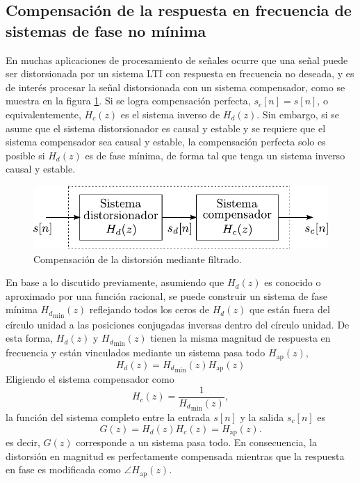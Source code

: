 \documentclass[a4paper]{report}
\begin{document}
\subsection{Compensación de la respuesta en frecuencia de sistemas de fase no mínima}\label{sec:transform_analysis_non_minimum_phase_compensation}

En muchas aplicaciones de procesamiento de señales ocurre que una señal puede ser distorsionada por un sistema LTI con respuesta en frecuencia no deseada, y es de interés procesar la señal distorsionada con un sistema compensador, como se muestra en la figura \ref{fig:non_minimum_phase_freq_response_compensation}. Si se logra compensación perfecta, \(s_c[n]=s[n]\), o equivalentemente, \(H_c(z)\) es el sistema inverso de \(H_d(z)\). Sin embargo, si se asume que el sistema distorsionador es causal y estable y se requiere que el sistema compensador sea causal y estable, la compensación perfecta solo es posible si \(H_d(z)\) es de fase mínima, de forma tal que tenga un sistema inverso causal y estable.
\begin{figure}[!htb]
 \begin{minipage}[c]{0.53\textwidth}
  \includegraphics[width=\textwidth]{figuras/non_minimum_phase_freq_response_compensation.pdf}
 \end{minipage}\hfill
 \begin{minipage}[c]{0.37\textwidth}
 \caption{Compensación de la distorsión mediante filtrado.
 }\label{fig:non_minimum_phase_freq_response_compensation}
 \end{minipage}
\end{figure}

En base a lo discutido previamente, asumiendo que \(H_d(z)\) es conocido o aproximado por una función racional, se puede construir un sistema de fase mínima \({H_d}_\textrm{min}(z)\) reflejando todos los ceros de \(H_d(z)\) que están fuera del círculo unidad a las posiciones conjugadas inversas dentro del círculo unidad. De esta forma, \(H_d(z)\) y \({H_d}_\textrm{min}(z)\) tienen la misma magnitud de respuesta en frecuencia y están vinculados mediante un sistema pasa todo \(H_\textrm{ap}(z)\),
\[
 H_d(z)={H_d}_\textrm{min}(z)H_\textrm{ap}(z)
\]
Eligiendo el sistema compensador como
\[
 H_c(z)=\frac{1}{{H_d}_\textrm{min}(z)},
\]
la función del sistema completo entre la entrada \(s[n]\) y la salida \(s_c[n]\) es
\[
 G(z)=H_d(z)H_c(z)=H_\textrm{ap}(z).
\]
es decir, \(G(z)\) corresponde a un sistema pasa todo. En consecuencia, la distorsión en magnitud es perfectamente compensada mientras que la respuesta en fase es modificada como \(\angle H_\textrm{ap}(z)\).
\end{document}

